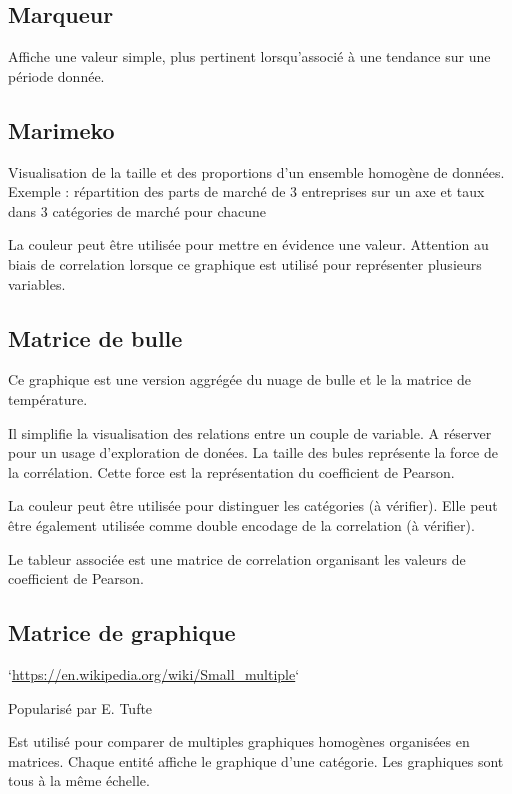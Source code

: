 \documentclass[a4paper,12pt]{article}
\begin{document}
\begin{multicols}{2}
\subsection*{Marqueur}
\label{sec:org8e91ac9}
Affiche une valeur simple, plus pertinent lorsqu'associé à une tendance sur une période donnée. \autocite{mikeyiHowChooseRight2020}
\subsection*{Marimeko}
\label{sec:orgb8c1c53}
Visualisation de la taille et des proportions d'un ensemble homogène de données. \autocite{alansmithLexiqueVisuel}
Exemple : répartition des parts de marché de 3 entreprises sur un axe et taux dans 3 catégories de marché pour chacune

La couleur peut être utilisée pour mettre en évidence une valeur. \autocite{jonathanschwabishComparingCategories2021} Attention au biais de correlation lorsque ce graphique est utilisé pour représenter plusieurs variables. \autocite{jonathanschwabishComparingCategories2021}
\subsection*{Matrice de bulle}
\label{sec:org1c2c5a7}
Ce graphique est une version aggrégée du nuage de bulle et le la matrice de température.

Il simplifie la visualisation des relations entre un couple de variable. A réserver pour un usage d'exploration de donées. \autocite{sosulskiGraphics2019} La taille des bules représente la force de la corrélation. Cette force est la représentation du coefficient de Pearson. \autocite{jonathanschwabishRelationship2021}

La couleur peut être utilisée pour distinguer les catégories (à vérifier). Elle peut être également utilisée comme double encodage de la correlation (à vérifier).

Le tableur associée est une matrice de correlation organisant les valeurs de coefficient de Pearson.
\subsection*{Matrice de graphique}
\label{sec:org520b4af}
`\url{https://en.wikipedia.org/wiki/Small\_multiple}`

Popularisé par E. Tufte

Est utilisé pour comparer de multiples graphiques homogènes organisées en matrices. Chaque entité affiche le graphique d'une catégorie. Les graphiques sont tous à la même échelle. \autocite{sosulskiGraphics2019}


\end{multicols}
\end{document}
